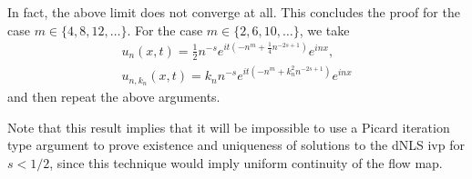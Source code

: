 %
In fact, the above limit does not converge at all. This concludes the proof for
the case $m \in \{4, 8, 12, \dots \}$. For the case $m \in \{2, 6, 10, \dots \}$, we take
%
%
\begin{equation*}
	\begin{split}
		u_{n}(x,t) = \frac{1}{2}n^{-s}e^{it\left( -n^{m} + \frac{1}{4}n^{-2s+1}
		\right)}e^{inx},
		\\ u_{n, k_{n}}(x,t) = k_{n}n^{-s}e^{it\left( -n^{m} + k_{n}^{2}n^{-2s+1}
		\right)}e^{inx} 
	\end{split}
\end{equation*}
and then repeat the above arguments. \qquad \qedsymbol
%
%
\begin{framed}
\begin{remark}
	Note that this result implies that it will be impossible to use a Picard
	iteration type argument to prove existence and uniqueness of solutions to the
	dNLS ivp for $s<1/2$, since this technique would imply uniform
	continuity of the flow map.
\end{remark}
\end{framed}
%
%
